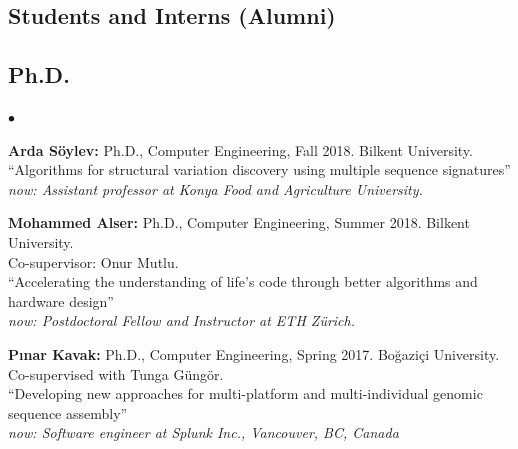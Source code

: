 \documentclass[margin,line]{res}
\newenvironment{list2}{
  \begin{list}{$\bullet$}{%
      \setlength{\itemsep}{0.1cm}
      \setlength{\parsep}{0in} \setlength{\parskip}{0in}
      \setlength{\topsep}{0in} \setlength{\partopsep}{0in} 
      \setlength{\leftmargin}{0.2in}}}{\end{list}}
\begin{document}
\begin{resume}
\clearpage

\section{\sc Students and Interns (Alumni)}
\vspace*{-.4cm}
\subsection{\small \sc Ph.D.}
\begin{list2}
\item
  {\bf Arda Söylev:} Ph.D., Computer Engineering, Fall 2018.
  Bilkent University. \\
  ``Algorithms for structural variation discovery using multiple sequence signatures''\\
    {\it now: Assistant professor at Konya Food and Agriculture University.}
\item
  {\bf Mohammed Alser:} Ph.D., Computer Engineering, Summer 2018.
  Bilkent University.\\ Co-supervisor: Onur Mutlu.\\
  ``Accelerating the understanding of life’s code through better algorithms and hardware design''\\
  {\it now: Postdoctoral Fellow and Instructor at ETH Zürich.}
\item
  {\bf P{\i}nar Kavak:} Ph.D., Computer Engineering, Spring 2017.
  Bo\u{g}azi\c{c}i University. Co-supervised with Tunga G\"{u}ng\"{o}r.\\
  ``Developing new approaches for multi-platform and multi-individual genomic sequence assembly''\\
  {\it now: Software engineer at Splunk Inc., Vancouver, BC, Canada}
\end{list2}

\vspace*{-.4cm}

\end{resume}
\end{document}
